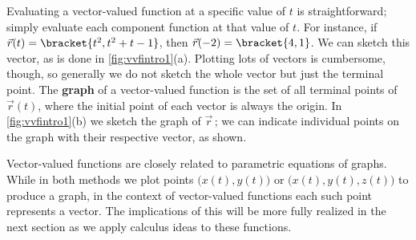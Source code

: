 Evaluating a vector-valued function at a specific value of $t$ is straightforward; simply evaluate each component function at that value of $t$. For instance, if $\vec r(t) =\bracket{t^2,t^2+t-1}$, then $\vec r(-2) =\bracket{4,1}$. We can sketch this vector, as is done in \autoref{fig:vvfintro1}(a). Plotting lots of vectors is cumbersome, though, so generally we do not sketch the whole vector but just the terminal point. The \textbf{graph} of a vector-valued function is the set of all terminal points of $\vec r(t)$, where the initial point of each vector is always the origin. In \autoref{fig:vvfintro1}(b) we sketch the graph of $\vec r$\,; we can indicate individual points on the graph with their respective vector, as shown.

Vector-valued functions are closely related to parametric equations of graphs. While in both methods we plot points $\big(x(t), y(t)\big)$ or $\big(x(t),y(t),z(t)\big)$ to produce a graph, in the context of vector-valued functions each such point represents a vector. The implications of this will be more fully realized in the next section as we apply calculus ideas to these functions.


